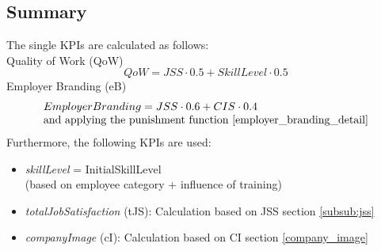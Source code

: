 \subsection{Summary}

The single KPIs are calculated as follows:\\
Quality of Work (\gls{QoW})
\begin{equation}
     QoW = JSS \cdot 0.5 + SkillLevel \cdot 0.5   
     \label{QoW}
\end{equation}
Employer Branding (\gls{eB})
\begin{equation}
  \begin{array}{l}
     Employer Branding = JSS \cdot 0.6 + CIS \cdot 0.4 \\ 
    \text{and applying the punishment function \ref{employer_branding_detail}} 
  \end{array}
\end{equation}
Furthermore, the following KPIs are used:

\begin{itemize}
\item \textit{skillLevel} = InitialSkillLevel \\
(based on employee category + influence of training)
\item \textit{totalJobSatisfaction} (tJS): Calculation based on JSS section \ref{subsub:jss}
\item \textit{companyImage} (cI): Calculation based on CI section \ref{company_image}
\end{itemize}